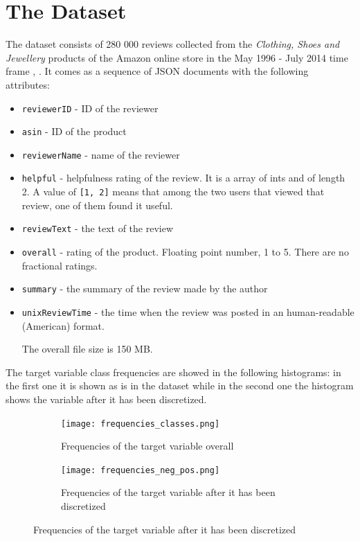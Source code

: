 \section{The Dataset}
The dataset consists of 280 000 reviews collected from the \textit{Clothing, Shoes and Jewellery} products of the Amazon online store in the May 1996 - July 2014 time frame \cite{HeAuley}, \cite{Auley}. It comes as a sequence of JSON documents with the following attributes:
\begin{itemize}
    \item \texttt{reviewerID} - ID of the reviewer
    \item \texttt{asin} - ID of the product
    \item \texttt{reviewerName} - name of the reviewer
    \item \texttt{helpful} - helpfulness rating of the review. It is a array of ints and of length 2. A value of \texttt{[1, 2]} means that among the two users that viewed that review, one of them found it useful.
    \item \texttt{reviewText} - the text of the review
    \item \texttt{overall} - rating of the product. Floating point number, 1 to 5. There are no fractional ratings.
    \item \texttt{summary} - the summary of the review made by the author
    \item \texttt{unixReviewTime} - the time when the review was posted in an human-readable (American) format.

The overall file size is 150 MB.
\end{itemize}
The target variable class frequencies are showed in the following histograms: in the first one it is shown as is in the dataset while in the second one the histogram shows the variable after it has been discretized.
\begin{figure}[h]
    \center
    \begin{subfigure}{0.49\textwidth}
    \texttt{[image: frequencies\_classes.png]}
    \caption{Frequencies of the target variable overall}
    \label{5*cloud}
    \end{subfigure}
    \begin{subfigure}{0.49\textwidth}
    \texttt{[image: frequencies\_neg\_pos.png]}
    \caption{Frequencies of the target variable after it has been discretized}
    \label{1*cloud}
    \end{subfigure}
\end{figure}


